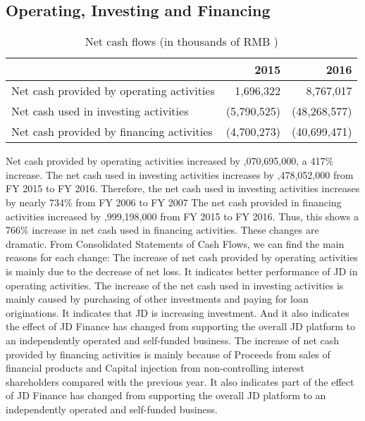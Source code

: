 \subsection{Operating, Investing and Financing}

\begin{table}[H]	
	\begin{center}
		\begin{tabular}{lrr}
			\toprule
			&\textbf{2015}&\textbf{2016}\\
			\midrule
			Net cash provided by operating activities&	1,696,322&	8,767,017\\
			Net cash used in investing activities&	(5,790,525)&	(48,268,577)\\
			Net cash provided by financing activities&	(4,700,273)	&(40,699,471)\\
			\bottomrule
		\end{tabular}
	\end{center}
	\caption{Net cash flows (in thousands of RMB \textyen)}\label{table:1}
\end{table}

Net cash provided by operating activities increased by ,070,695,000, a 417\% increase.  
The net cash used in investing activities increases by ,478,052,000 from FY 2015 to FY 2016. Therefore, the net cash used in investing activities increases by nearly 734\% from FY 2006 to FY 2007
The net cash provided in financing activities increased by ,999,198,000 from FY 2015 to FY 2016. Thus, this shows a 766\% increase in net cash used in financing activities.
These changes are dramatic. From Consolidated Statements of Cash Flows, we can find the main reasons for each change:
The increase of net cash provided by operating activities is mainly due to the decrease of net loss. It indicates better performance of JD in operating activities.
The increase of the net cash used in investing activities is mainly caused by purchasing of other investments and paying for loan originations. It indicates that JD is increasing investment. And it also indicates the effect of JD Finance has changed from supporting the overall JD platform to an independently operated and self-funded business.
The increase of net cash provided by financing activities is mainly because of Proceeds from sales of financial products and Capital injection from non-controlling interest shareholders compared with the previous year. It also indicates part of the effect of JD Finance has changed from supporting the overall JD platform to an independently operated and self-funded business.

